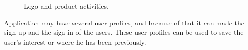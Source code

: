 \begin{figure}[!htb]
	\centering
	\begin{subfigmatrix}{2}
	\end{subfigmatrix}
	\caption[Logo and product activities]{Logo and product activities.}
	\label{fig:app_logo}
\end{figure}


Application may have several user profiles, and because of that it can made the sign up and the sign in of the users. These user profiles can be used to save the user's interest or where he has been previously.


